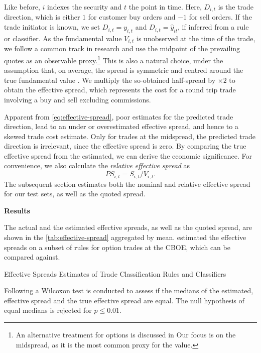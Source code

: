 Like before, $i$ indexes the security and $t$ the point in time. Here, $D_{i,t}$ is the trade direction, which is either $1$ for customer buy orders and $-1$ for sell orders. If the trade initiator is known, we set $D_{i,t} = y_{i,t}$ and $D_{i,t}=\hat{y}_{it}$, if inferred from a rule or classifier. As the fundamental value $V_{i,t}$ is unobserved at the time of the trade, we follow a common track in research and use the midpoint of the prevailing quotes as an observable proxy.\footnote{An alternative treatment for options is discussed in \textcite[][4975--4976]{muravyevOptionsTradingCosts2020} Our focus is on the midspread, as it is the most common proxy for the value.} This is also a natural choice, under the assumption that, on average, the spread is symmetric and centred around the true fundamental value \autocite[][1018]{leeMarketIntegrationPrice1993}. We multiply the so-obtained half-spread by $\times 2$ to obtain the effective spread, which represents the cost for a round trip trade involving a buy and sell excluding commissions.

Apparent from \cref{eq:effective-spread}, poor estimates for the predicted trade direction, lead to an under or overestimated effective spread, and hence to a skewed trade cost estimate. Only for trades at the midspread, the predicted trade direction is irrelevant, since the effective spread is zero. By comparing the true effective spread from the estimated, we can derive the economic significance. For convenience, we also calculate the \emph{relative effective spread} as
\begin{equation}
    {PS}_{i,t} = S_{i,t} / V_{i,t}.
\end{equation}
The subsequent section estimates both the nominal and relative effective spread for our test sets, as well as the quoted spread.

\textbf{Results}

The actual and the estimated effective spreads, as well as the quoted spread, are shown in the \cref{tab:effective-spread} aggregated by mean. \textcite[][896--897]{savickasInferringDirectionOption2003} estimated the effective spreads on a subset of rules for option trades at the \gls{CBOE}, which can be compared against.

\begin{table}[H]
    \centering
    
    \caption{Effective Spreads Estimates of Trade Classification Rules and Classifiers}
    \label{tab:effective-spread}
\end{table}

Following \textcite[][12]{theissenTestAccuracyLee2000} a Wilcoxon test is conducted to assess if the medians of the estimated, effective spread and the true effective spread are equal. The null hypothesis of equal medians is rejected for $p \leq 0.01$.


